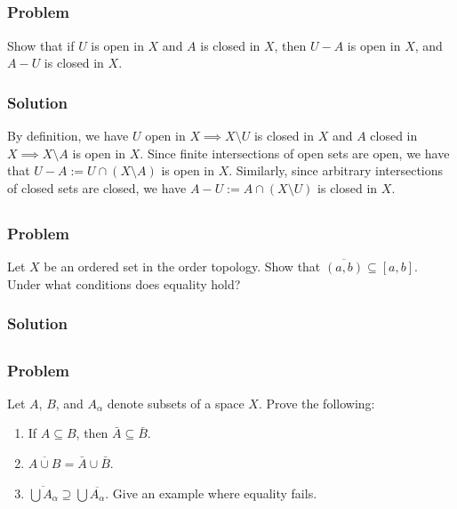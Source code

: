 \setcounter{subsection}{3} %
\subsection{}

\subsubsection{Problem}
Show that if $U$ is open in $X$ and $A$ is closed in $X$, then $U-A$ is open in $X$, and $A-U$ is closed in $X$.
\subsubsection{Solution}
By definition, we have $U$ open in $X \implies X\setminus U$ is closed in $X$ and $A$ closed in $X \implies X\setminus A$ is open in $X$. Since finite intersections of open sets are open, we have that $U-A := U \cap (X\setminus A)$ is open in $X$. Similarly, since arbitrary intersections of closed sets are closed, we have $A-U := A \cap (X\setminus U)$ is closed in $X$.


\setcounter{subsection}{4} %
\subsection{}

\subsubsection{Problem}
Let $X$ be an ordered set in the order topology. Show that $\overline{(a, b)} \subseteq [a, b]$. Under what conditions does equality hold?
\subsubsection{Solution}
\todo


\setcounter{subsection}{5} %
\subsection{}

\subsubsection{Problem}
Let $A$, $B$, and $A_\alpha$ denote subsets of a space $X$. Prove the following:
\begin{enumerate}
 \item If $A \subseteq B$, then $\bar{A} \subseteq \bar{B}$.
 \item $\overline{A \cup B} = \bar A \cup \bar B$.
 \item $\overline{\bigcup A_\alpha} \supseteq \bigcup \overline{A_\alpha}$. Give an example where equality fails.
\end{enumerate}
